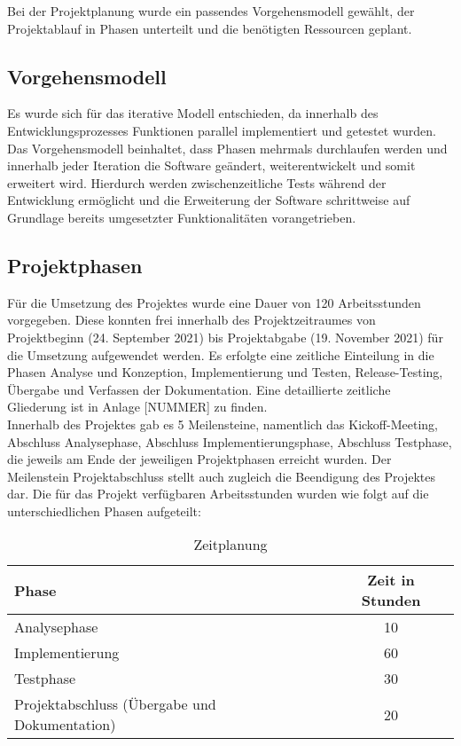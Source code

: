 Bei der Projektplanung wurde ein passendes Vorgehensmodell gewählt, der Projektablauf in Phasen unterteilt und die benötigten Ressourcen geplant.

\subsection{Vorgehensmodell}
    Es wurde sich für das iterative Modell entschieden, da innerhalb des Entwicklungsprozesses Funktionen parallel implementiert und getestet wurden. Das Vorgehensmodell beinhaltet, dass Phasen mehrmals durchlaufen werden und innerhalb jeder Iteration die Software geändert, weiterentwickelt und somit erweitert wird. Hierdurch werden zwischenzeitliche Tests während der Entwicklung ermöglicht und die Erweiterung der Software schrittweise auf Grundlage bereits umgesetzter Funktionalitäten vorangetrieben.

\subsection{Projektphasen}
    Für die Umsetzung des Projektes wurde eine Dauer von 120 Arbeitsstunden vorgegeben. Diese konnten frei innerhalb des Projektzeitraumes von Projektbeginn (24. September 2021) bis Projektabgabe (19. November 2021) für die Umsetzung aufgewendet werden. Es erfolgte eine zeitliche Einteilung in die Phasen Analyse und Konzeption, Implementierung und Testen, Release-Testing, Übergabe und Verfassen der Dokumentation. Eine detaillierte zeitliche Gliederung ist in Anlage [NUMMER] zu finden.\\
    Innerhalb des Projektes gab es 5 Meilensteine, namentlich das \glqq Kickoff-Meeting\grqq{}, \glqq Abschluss Analysephase\grqq{}, \glqq Abschluss Implementierungsphase\grqq{}, \glqq Abschluss Testphase\grqq{}, die jeweils am Ende der jeweiligen Projektphasen erreicht wurden. Der Meilenstein \glqq Projektabschluss\grqq{} stellt auch zugleich die Beendigung des Projektes dar. Die für das Projekt verfügbaren Arbeitsstunden wurden wie folgt auf die unterschiedlichen Phasen aufgeteilt:\\

    \vspace{1cm}
    \begin{table}[h]
        \centering
        \begin{tabular}{l|c}
            Phase & Zeit in Stunden \\
            \hline
            Analysephase & 10 \\
            Implementierung & 60 \\
            Testphase & 30 \\
            Projektabschluss (Übergabe und Dokumentation) & 20
        \end{tabular}
        \caption{Zeitplanung}
    \end{table}
\pagebreak
